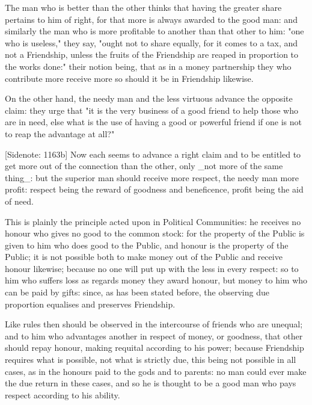 The man who is better than the other thinks that having the greater
share pertains to him of right, for that more is always awarded to the
good man: and similarly the man who is more profitable to another than
that other to him: "one who is useless," they say, "ought not to share
equally, for it comes to a tax, and not a Friendship, unless the fruits
of the Friendship are reaped in proportion to the works done:" their
notion being, that as in a money partnership they who contribute more
receive more so should it be in Friendship likewise.

On the other hand, the needy man and the less virtuous advance the
opposite claim: they urge that "it is the very business of a good friend
to help those who are in need, else what is the use of having a good or
powerful friend if one is not to reap the advantage at all?"

[Sidenote: 1163b] Now each seems to advance a right claim and to be
entitled to get more out of the connection than the other, only _not
more of the same thing_: but the superior man should receive more
respect, the needy man more profit: respect being the reward of goodness
and beneficence, profit being the aid of need.

This is plainly the principle acted upon in Political Communities:
he receives no honour who gives no good to the common stock: for the
property of the Public is given to him who does good to the Public, and
honour is the property of the Public; it is not possible both to make
money out of the Public and receive honour likewise; because no one will
put up with the less in every respect: so to him who suffers loss as
regards money they award honour, but money to him who can be paid by
gifts: since, as has been stated before, the observing due proportion
equalises and preserves Friendship.

Like rules then should be observed in the intercourse of friends who
are unequal; and to him who advantages another in respect of money, or
goodness, that other should repay honour, making requital according to
his power; because Friendship requires what is possible, not what is
strictly due, this being not possible in all cases, as in the honours
paid to the gods and to parents: no man could ever make the due return
in these cases, and so he is thought to be a good man who pays respect
according to his ability.

